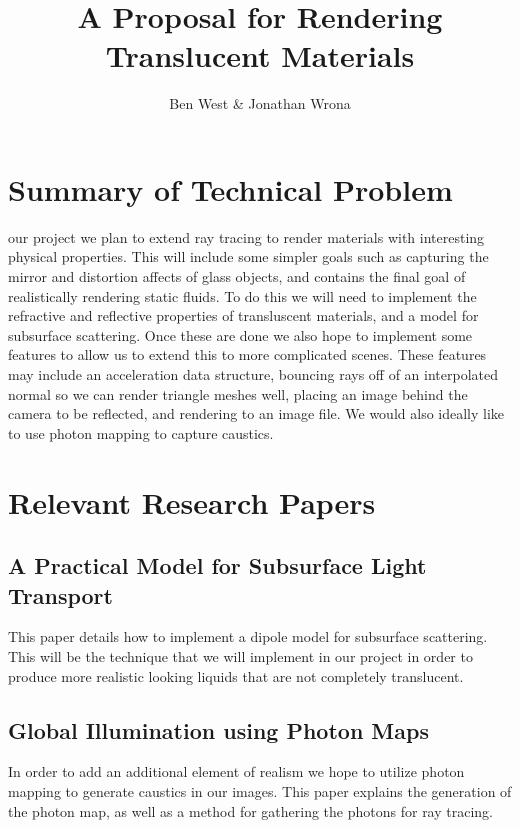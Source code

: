 \documentclass[journal, a4paper]{IEEEtran}
\begin{document}
    \title{A Proposal for Rendering Translucent Materials}
    \author{Ben West \& Jonathan Wrona}
    \maketitle

\section{Summary of Technical Problem}
     our project we plan to extend ray tracing to render materials with interesting physical properties. This will include some simpler goals such as capturing the mirror and distortion affects of glass objects, and contains the final goal of realistically rendering static fluids. To do this we will need to implement the refractive and reflective properties of transluscent materials, and a model for subsurface scattering. Once these are done we also hope to implement some features to allow us to extend this to more complicated scenes. These features may include an acceleration data structure, bouncing rays off of an interpolated normal so we can render triangle meshes well, placing an image behind the camera to be reflected, and rendering to an image file. We would also ideally like to use photon mapping to capture caustics.

\section{Relevant Research Papers}
    \subsection{A Practical Model for Subsurface Light Transport}
        This paper details how to implement a dipole model for subsurface scattering. This will be the technique that we will implement in our project in order to produce more realistic looking liquids that are not completely translucent.
    \subsection{Global Illumination using Photon Maps}
        In order to add an additional element of realism we hope to utilize photon mapping to generate caustics in our images. This paper explains the generation of the photon map, as well as a method for gathering the photons for ray tracing.
\end{document}
